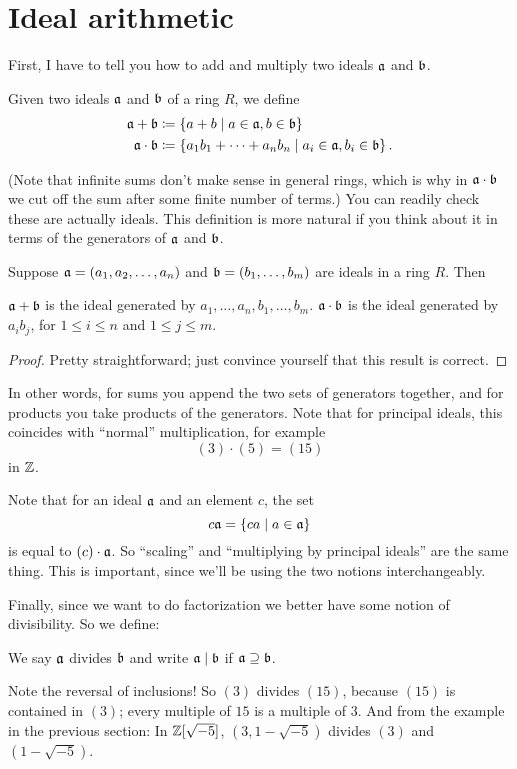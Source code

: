\section{Ideal arithmetic}
First, I have to tell you how to add and multiply two ideals $\mathfrak a$ and $\mathfrak b$.
\begin{definition}
	Given two ideals $\mathfrak a$ and $\mathfrak b$ of a ring $R$, we define
	\begin{align*}
		\mathfrak a + \mathfrak b &\coloneqq \left\{ a+b \mid a \in \mathfrak a, b \in \mathfrak b \right\} \\
		\mathfrak a \cdot \mathfrak b &\coloneqq \left\{ a_1b_1 + \dots + a_n b_n
			\mid a_i \in \mathfrak a, b_i \in \mathfrak b \right\}.
	\end{align*}
\end{definition}
(Note that infinite sums don't make sense in general rings, which is why in $\mathfrak a \cdot \mathfrak b$
we cut off the sum after some finite number of terms.)
You can readily check these are actually ideals.
This definition is more natural if you think about it in terms of
the generators of $\mathfrak a$ and $\mathfrak b$.
\begin{proposition}
	Suppose $\mathfrak a = \left( a_1, a_2, \dots, a_n \right)$
	and $\mathfrak b = \left( b_1, \dots, b_m \right)$ are ideals in a ring $R$.
	Then
	\begin{enumerate}[(a)]
		\ii $\mathfrak a + \mathfrak b$ is the ideal generated by $a_1, \dots, a_n, b_1, \dots, b_m$.
		\ii $\mathfrak a \cdot \mathfrak b$ is the ideal generated by $a_i b_j$,
		for $1 \le i \le n$ and $1 \le j \le m$.
	\end{enumerate}
\end{proposition}
\begin{proof}
	Pretty straightforward; just convince yourself that this result is correct.
\end{proof}
In other words, for sums you append the two sets of generators together,
and for products you take products of the generators.
Note that for principal ideals, this coincides with ``normal'' multiplication,
for example
\[ (3) \cdot (5) = (15) \]
in $\mathbb Z$.
\begin{remark}
Note that for an ideal $\mathfrak a$ and an element $c$,
the set \[ c \mathfrak a = \left\{ ca \mid a \in \mathfrak a \right\} \]
is equal to $(c) \cdot \mathfrak a$.
So ``scaling'' and ``multiplying by principal ideals'' are the same thing.
This is important, since we'll be using the two notions interchangeably.
\end{remark}

Finally, since we want to do factorization we better have some notion of divisibility.
So we define:
\begin{definition}
	We say $\mathfrak a$ divides $\mathfrak b$ and write $\mathfrak a \mid \mathfrak b$ if $\mathfrak a \supseteq \mathfrak b$.
\end{definition}
Note the reversal of inclusions!
So $(3)$ divides $(15)$, because $(15)$ is contained in $(3)$;
every multiple of $15$ is a multiple of $3$.
And from the example in the previous section: In $\mathbb Z[\sqrt{-5}]$,
$(3,1-\sqrt{-5})$ divides $(3)$ and $(1 - \sqrt{-5})$.

